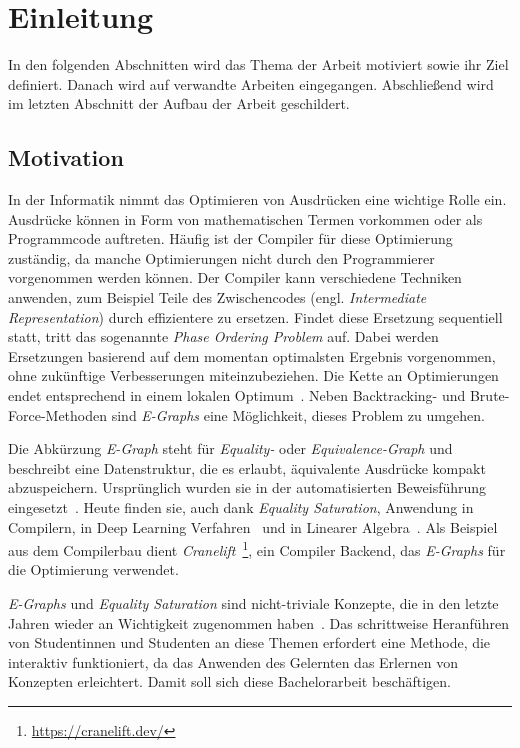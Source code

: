 \section{Einleitung}\label{sec:einleitung}

In den folgenden Abschnitten wird das Thema der Arbeit motiviert sowie ihr Ziel definiert.
Danach wird auf verwandte Arbeiten eingegangen.
Abschließend wird im letzten Abschnitt der Aufbau der Arbeit geschildert.

\subsection{Motivation}

\noindent In der Informatik nimmt das Optimieren von Ausdrücken eine wichtige Rolle ein. 
Ausdrücke können in Form von mathematischen Termen vorkommen oder als Programmcode auftreten.
Häufig ist der Compiler für diese Optimierung zuständig, da manche Optimierungen nicht durch den Programmierer vorgenommen werden können. 
Der Compiler kann verschiedene Techniken anwenden, zum Beispiel Teile des Zwischencodes (engl. \textit{Intermediate Representation}) durch effizientere zu ersetzen.
Findet diese Ersetzung sequentiell statt, tritt das sogenannte \textit{Phase Ordering Problem} auf. 
Dabei werden Ersetzungen basierend auf dem momentan optimalsten Ergebnis vorgenommen, ohne zukünftige Verbesserungen miteinzubeziehen.
Die Kette an Optimierungen endet entsprechend in einem lokalen Optimum~\cite{phaseorder-2009}.
Neben Backtracking- und Brute-Force-Methoden sind \textit{E-Graphs} eine Möglichkeit, dieses Problem zu umgehen. 

\noindent Die Abkürzung \textit{E-Graph} steht für \textit{Equality-} oder \textit{Equivalence-Graph} und beschreibt eine Datenstruktur, die es
erlaubt, äquivalente Ausdrücke kompakt abzuspeichern.
Ursprünglich wurden sie in der automatisierten Beweisführung eingesetzt~\cite{2021-egg}. Heute finden sie, auch dank \textit{Equality Saturation}, Anwendung in Compilern, in 
Deep Learning Verfahren~\cite{yang2021} und in Linearer Algebra~\cite{wang2020}.
Als Beispiel aus dem Compilerbau dient \textit{Cranelift}~\footnote{\hspace{1.5mm}\url{https://cranelift.dev/}}, ein Compiler Backend, das \textit{E-Graphs} für die Optimierung verwendet.

\noindent \textit{E-Graphs} und \textit{Equality Saturation} sind nicht-triviale Konzepte, die in den letzte Jahren wieder an Wichtigkeit zugenommen haben~\cite[S.~2]{eqsatexploration}.
Das schrittweise Heranführen von Studentinnen und Studenten an diese Themen erfordert eine Methode, die interaktiv funktioniert, da das Anwenden des Gelernten 
das Erlernen von Konzepten erleichtert. Damit soll sich diese Bachelorarbeit beschäftigen. 

